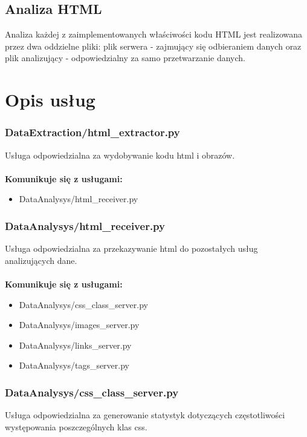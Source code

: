 \documentclass[12pt]{article}
\begin{document}
\subsection{Analiza HTML}
Analiza każdej z zaimplementowanych właściwości kodu HTML jest realizowana przez dwa oddzielne pliki: plik serwera - zajmujący się odbieraniem danych oraz plik analizujący - odpowiedzialny za samo przetwarzanie danych. 

\section{Opis usług}

\subsubsection{DataExtraction/html\_extractor.py} 
Usługa odpowiedzialna za wydobywanie kodu html i obrazów.
\mbox{}\\\\
\textbf{Komunikuje się z usługami:}\\
\begin{itemize}
\item DataAnalysys/html\_receiver.py
\end{itemize} 

\subsubsection{DataAnalysys/html\_receiver.py} 
Usługa odpowiedzialna za przekazywanie html do pozostałych usług analizujących dane.
\mbox{}\\\\
\textbf{Komunikuje się z usługami:}\\
\begin{itemize}
\item DataAnalysys/css\_class\_server.py
\item DataAnalysys/images\_server.py
\item DataAnalysys/links\_server.py
\item DataAnalysys/tags\_server.py
\end{itemize} 

\subsubsection{DataAnalysys/css\_class\_server.py} 
Usługa odpowiedzialna za generowanie statystyk dotyczących częstotliwości występowania poszczególnych klas css.
\end{document}
